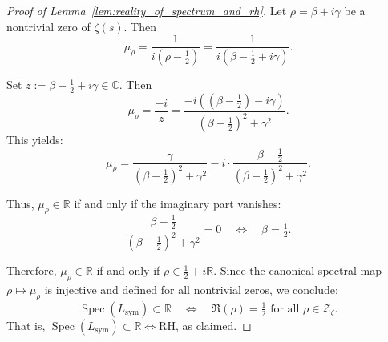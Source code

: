 \begin{proof}[Proof of Lemma~\ref{lem:reality_of_spectrum_and_rh}]
Let \( \rho = \beta + i\gamma \) be a nontrivial zero of \( \zeta(s) \). Then
\[
\mu_\rho = \frac{1}{i(\rho - \tfrac{1}{2})} = \frac{1}{i(\beta - \tfrac{1}{2} + i\gamma)}.
\]

Set \( z := \beta - \tfrac{1}{2} + i\gamma \in \mathbb{C} \). Then
\[
\mu_\rho = \frac{-i}{z} = \frac{-i((\beta - \tfrac{1}{2}) - i\gamma)}{(\beta - \tfrac{1}{2})^2 + \gamma^2}.
\]
This yields:
\[
\mu_\rho = \frac{\gamma}{(\beta - \tfrac{1}{2})^2 + \gamma^2} - i \cdot \frac{\beta - \tfrac{1}{2}}{(\beta - \tfrac{1}{2})^2 + \gamma^2}.
\]

Thus, \( \mu_\rho \in \mathbb{R} \) if and only if the imaginary part vanishes:
\[
\frac{\beta - \tfrac{1}{2}}{(\beta - \tfrac{1}{2})^2 + \gamma^2} = 0 \quad \Longleftrightarrow \quad \beta = \tfrac{1}{2}.
\]

Therefore, \( \mu_\rho \in \mathbb{R} \) if and only if \( \rho \in \tfrac{1}{2} + i\mathbb{R} \). Since the canonical spectral map \( \rho \mapsto \mu_\rho \) is injective and defined for all nontrivial zeros, we conclude:
\[
\operatorname{Spec}(L_{\mathrm{sym}}) \subset \mathbb{R}
\quad \iff \quad
\Re(\rho) = \tfrac{1}{2} \text{ for all } \rho \in \mathcal{Z}_\zeta.
\]
That is, \( \operatorname{Spec}(L_{\mathrm{sym}}) \subset \mathbb{R} \iff \mathrm{RH} \), as claimed.
\end{proof}
% 